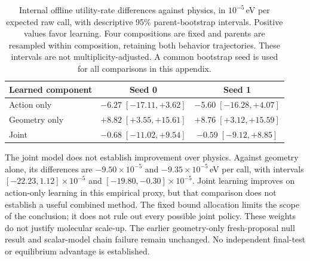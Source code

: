 \begin{table}[h]
\centering
\small
\begin{tabular}{lcc}
\toprule
Learned component & Seed 0 & Seed 1 \\
\midrule
Action only & $-6.27\;[-17.11,+3.62]$ & $-5.60\;[-16.28,+4.07]$ \\
Geometry only & $+8.82\;[+3.55,+15.61]$ & $+8.76\;[+3.12,+15.59]$ \\
Joint & $-0.68\;[-11.02,+9.54]$ & $-0.59\;[-9.12,+8.85]$ \\
\bottomrule
\end{tabular}
\caption{Internal offline utility-rate differences against physics, in
$10^{-5}$\,eV per expected raw call, with descriptive 95\% parent-bootstrap
intervals. Positive values favor learning. Four compositions are fixed and
parents are resampled within composition, retaining both behavior trajectories.
These intervals are not multiplicity-adjusted. A common bootstrap seed is used
for all comparisons in this appendix.}
\label{tab:action-geometry}
\end{table}

The joint model does not establish improvement over physics. Against geometry
alone, its differences are $-9.50\times10^{-5}$ and $-9.35\times10^{-5}$\,eV per
call, with intervals $[-22.23,1.12]\times10^{-5}$ and
$[-19.80,-0.30]\times10^{-5}$. Joint learning improves on action-only learning
in this empirical proxy, but that comparison does not establish a useful
combined method. The fixed bound allocation limits the scope of the conclusion;
it does not rule out every possible joint policy. These weights do not justify
molecular scale-up. The earlier geometry-only fresh-proposal null result and
scalar-model chain failure remain unchanged. No independent final-test or
equilibrium advantage is established.
